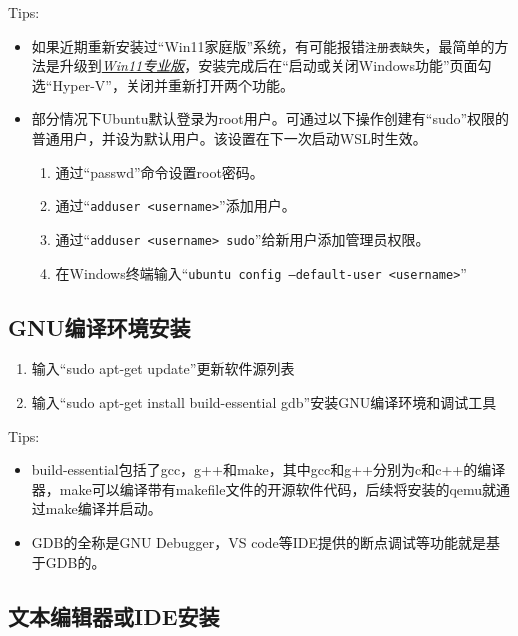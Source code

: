\documentclass[fontset=ubuntu]{ctexart}
\let\oldhref\href{}
\renewcommand{\href}[2]{\oldhref{#1}{\textit{#2}}}
\begin{document}
\noindent Tips:
\vspace{-0.5cm}
\begin{itemize}
    \item 如果近期重新安装过“Win11家庭版”系统，有可能报错\texttt{注册表缺失}，最简单的方法是升级到\href{https://software.seu.edu.cn/soft/detail/18}{Win11专业版}，安装完成后在“启动或关闭Windows功能”页面勾选“Hyper-V”，关闭并重新打开两个功能。
    \item 部分情况下Ubuntu默认登录为root用户。可通过以下操作创建有“sudo”权限的普通用户，并设为默认用户。该设置在下一次启动WSL时生效。
          \begin{enumerate}
              \item 通过“passwd”命令设置root密码。
              \item 通过“\texttt{adduser\ \textless{}username\textgreater{}}”添加用户。
              \item 通过“\texttt{adduser\ \textless{}username\textgreater{}\ sudo}”给新用户添加管理员权限。
              \item 在Windows终端输入“\texttt{ubuntu\ config\ --default-user\ \textless{}username\textgreater{}}”
          \end{enumerate}
\end{itemize}

\subsection{GNU编译环境安装}

\begin{enumerate}
    \item 输入“sudo apt-get update”更新软件源列表
    \item 输入“sudo apt-get install build-essential gdb”安装GNU编译环境和调试工具
\end{enumerate}

\noindent Tips:
\vspace{-0.5cm}
\begin{itemize}
    \item build-essential包括了gcc，g++和make，其中gcc和g++分别为c和c++的编译器，make可以编译带有makefile文件的开源软件代码，后续将安装的qemu就通过make编译并启动。
    \item GDB的全称是GNU Debugger，VS code等IDE提供的断点调试等功能就是基于GDB的。
\end{itemize}

\subsection{文本编辑器或IDE安装}
\end{document}
